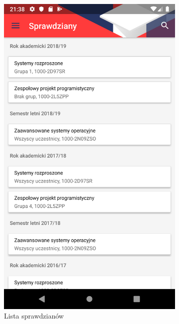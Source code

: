 \documentclass{pracamgr}
\begin{document}
\begin{figure}[p]
	\centering
	\begin{subfigure}[t]{0.3\textwidth}
		\includegraphics[width=\textwidth]{img/emptests_list.png}
		\caption{Lista sprawdzianów}
		\label{fig:emptests_list}
	\end{subfigure}
	\quad
	\begin{subfigure}[t]{0.3\textwidth}

\end{subfigure}
\end{figure}
\end{document}
